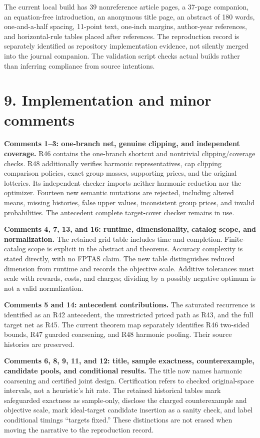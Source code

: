 \documentclass[11pt,letterpaper]{article}
\begin{document}
The current local build has 39 nonreference article pages, a 37-page companion, an equation-free introduction, an anonymous title page, an abstract of 180 words, one-and-a-half spacing, 11-point text, one-inch margins, author-year references, and horizontal-rule tables placed after references. The reproduction record is separately identified as repository implementation evidence, not silently merged into the journal companion. The validation script checks actual builds rather than inferring compliance from source intentions.



\section*{9. Implementation and minor comments}


\textbf{Comments 1–3: one-branch net, genuine clipping, and independent coverage.} R46 contains the one-branch shortcut and nontrivial clipping/coverage checks. R48 additionally verifies harmonic representatives, cap clipping comparison policies, exact group masses, supporting prices, and the original lotteries. Its independent checker imports neither harmonic reduction nor the optimizer. Fourteen new semantic mutations are rejected, including altered means, missing histories, false upper values, inconsistent group prices, and invalid probabilities. The antecedent complete target-cover checker remains in use.



\textbf{Comments 4, 7, 13, and 16: runtime, dimensionality, catalog scope, and normalization.} The retained grid table includes time and completion. Finite-catalog scope is explicit in the abstract and theorems. Accuracy complexity is stated directly, with no FPTAS claim. The new table distinguishes reduced dimension from runtime and records the objective scale. Additive tolerances must scale with rewards, costs, and charges; dividing by a possibly negative optimum is not a valid normalization.



\textbf{Comments 5 and 14: antecedent contributions.} The saturated recurrence is identified as an R42 antecedent, the unrestricted priced path as R43, and the full target net as R45. The current theorem map separately identifies R46 two-sided bounds, R47 guarded coarsening, and R48 harmonic pooling. Their source histories are preserved.



\textbf{Comments 6, 8, 9, 11, and 12: title, sample exactness, counterexample, candidate pools, and conditional results.} The title now names harmonic coarsening and certified joint design. Certification refers to checked original-space intervals, not a heuristic's hit rate. The retained historical tables mark safeguarded exactness as sample-only, disclose the charged counterexample and objective scale, mark ideal-target candidate insertion as a sanity check, and label conditional timings “targets fixed.” These distinctions are not erased when moving the narrative to the reproduction record.
\end{document}
